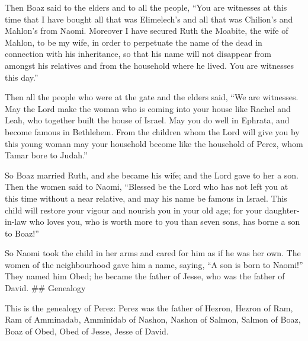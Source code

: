  Then Boaz said to the elders and to all the people, ``You
are witnesses at this time that I have bought all that was Elimelech's
and all that was Chilion's and Mahlon's from Naomi. 
Moreover I have secured Ruth the Moabite, the wife of Mahlon, to be my
wife, in order to perpetuate the name of the dead in connection with his
inheritance, so that his name will not disappear from amongst his
relatives and from the household where he lived. You are witnesses this
day.''

 Then all the people who were at the gate and the elders
said, ``We are witnesses. May the Lord make the woman who is coming into
your house like Rachel and Leah, who together built the house of Israel.
May you do well in Ephrata, and become famous in Bethlehem.
 From the children whom the Lord will give you by this
young woman may your household become like the household of Perez, whom
Tamar bore to Judah.''

 So Boaz married Ruth, and she became his wife; and the
Lord gave to her a son.  Then the women said to Naomi,
``Blessed be the Lord who has not left you at this time without a near
relative, and may his name be famous in Israel.  This child
will restore your vigour and nourish you in your old age; for your
daughter-in-law who loves you, who is worth more to you than seven sons,
has borne a son to Boaz!''

 So Naomi took the child in her arms and cared for him as
if he was her own.  The women of the neighbourhood gave him
a name, saying, ``A son is born to Naomi!'' They named him Obed; he
became the father of Jesse, who was the father of David. \#\# Genealogy

 This is the genealogy of Perez: Perez was the father of
Hezron,  Hezron of Ram, Ram of Amminadab, 
Amminidab of Nashon, Nashon of Salmon,  Salmon of Boaz,
Boaz of Obed,  Obed of Jesse, Jesse of David.
